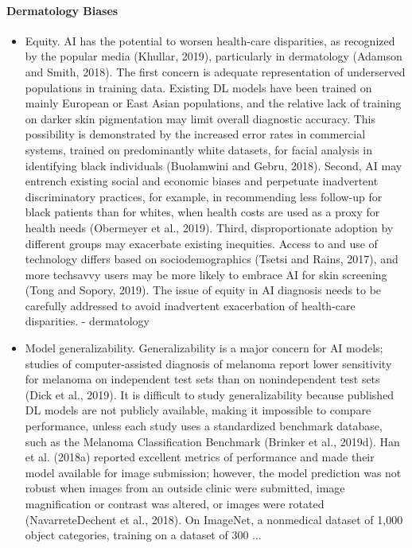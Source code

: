 \begin{refsection}
		\paragraph{Dermatology Biases}
		\begin{itemize}
			\item Equity. \gls{AI} has the potential to worsen health-care disparities, as recognized by the popular media (Khullar, 2019), particularly in dermatology (Adamson and Smith, 2018). The first concern is adequate representation of underserved populations in training data. Existing DL models have been trained on mainly European or East Asian populations, and the relative lack of training on darker skin pigmentation may limit overall diagnostic accuracy. This possibility is demonstrated by the increased error rates in commercial systems, trained on predominantly white datasets, for facial analysis in identifying black individuals (Buolamwini and Gebru, 2018). Second, \gls{AI} may entrench existing social and economic biases and perpetuate inadvertent discriminatory practices, for example, in recommending less follow-up for black patients than for whites, when health costs are used as a proxy for health needs (Obermeyer et al., 2019). Third, disproportionate adoption by different groups may exacerbate existing inequities. Access to and use of technology differs based on sociodemographics (Tsetsi and Rains, 2017), and more techsavvy users may be more likely to embrace \gls{AI} for skin screening (Tong and Sopory, 2019). The issue of equity in \gls{AI} diagnosis needs to be carefully addressed to avoid inadvertent exacerbation of health-care disparities. \autocite{Young_2020} - dermatology
			\item Model generalizability. Generalizability is a major concern for \gls{AI} models; studies of computer-assisted diagnosis of melanoma report lower sensitivity for melanoma on independent test sets than on nonindependent test sets (Dick et al., 2019). It is difficult to study generalizability because published DL models are not publicly available, making it impossible to compare performance, unless each study uses a standardized benchmark database, such as the Melanoma Classification Benchmark (Brinker et al., 2019d). Han et al. (2018a) reported excellent metrics of performance and made their model available for image submission; however, the model prediction was not robust when images from an outside clinic were submitted, image magnification or contrast was altered, or images were rotated (NavarreteDechent et al., 2018). On ImageNet, a nonmedical dataset of 1,000 object categories, training on a dataset of 300 ... \autocite{Young_2020}
		\end{itemize}
		\rawcitationend
		

\end{refsection}
